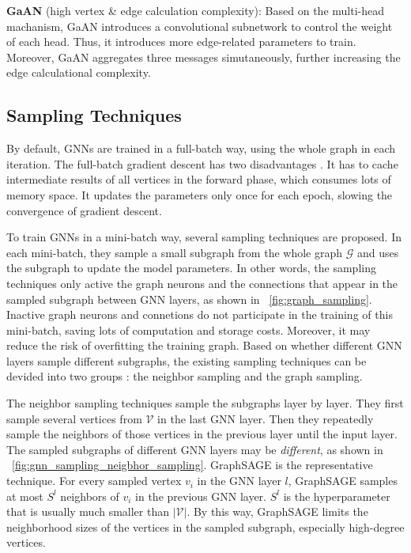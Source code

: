 \textbf{GaAN} (high vertex \& edge calculation complexity):
Based on the multi-head machanism, GaAN introduces a convolutional subnetwork to control the weight of each head.
Thus, it introduces more edge-related parameters to train.
Moreover, GaAN aggregates three messages simutaneously, further increasing the edge calculational complexity.

\subsection{Sampling Techniques}

By default, GNNs are trained in a full-batch way, using the whole graph in each iteration.
The full-batch gradient descent has two disadvantages \cite{chiang2019_cluster_gcn}.
It has to cache intermediate results of all vertices in the forward phase, which consumes lots of memory space.
It updates the parameters only once for each epoch, slowing the convergence of gradient descent.

To train GNNs in a mini-batch way, several sampling techniques \cite{chiang2019_cluster_gcn} are proposed.
In each mini-batch, they sample a small subgraph from the whole graph $\mathcal{G}$ and uses the subgraph to update the model parameters.
In other words, the sampling techniques only active the graph neurons and the connections that appear in the sampled subgraph between GNN layers, as shown in \figurename~\ref{fig:graph_sampling}.
Inactive graph neurons and connetions do not participate in the training of this mini-batch, saving lots of computation and storage costs.
Moreover, it may reduce the risk of overfitting the training graph.
Based on whether different GNN layers sample different subgraphs, the existing sampling techniques can be devided into two groups \cite{zeng2020_graphsaint}: the neighbor sampling and the graph sampling.

The neighbor sampling techniques \cite{hamilton2017_graphsage, ying2018_pinsage, chen2018_fastgcn, chen2018_sgcn, huang2018_adap} sample the subgraphs layer by layer.
They first sample several vertices from $\mathcal{V}$ in the last GNN layer.
Then they repeatedly sample the neighbors of those vertices in the previous layer until the input layer.
The sampled subgraphs of different GNN layers may be \emph{different}, as shown in \figurename~\ref{fig:gnn_sampling_neigbhor_sampling}.
GraphSAGE \cite{hamilton2017_graphsage} is the representative technique.
For every sampled vertex $v_i$ in the GNN layer $l$, GraphSAGE samples at most $S^l$ neighbors of $v_i$ in the previous GNN layer.
$S^l$ is the hyperparameter that is usually much smaller than $|\mathcal{V}|$.
By this way, GraphSAGE limits the neighborhood sizes of the vertices in the sampled subgraph, especially high-degree vertices.

